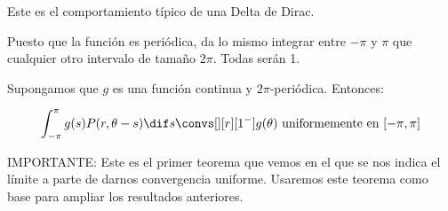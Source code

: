\begin{itemize}
			Este es el comportamiento típico de una Delta de Dirac.

			\begin{center}
			\end{center}

			\noindent Puesto que la función es periódica, da lo mismo integrar entre $-\pi$ y $\pi$ que cualquier otro intervalo de tamaño $2\pi$. Todas serán 1.

		\end{itemize}

		\begin{theorem} \label{thm:ConvUniformePoisson}
			Supongamos que $g$ es una función continua y $2\pi$-periódica. Entonces:

			\[ \int^\pi_{-\pi} g(s)P(r, \theta-s) \dif s \convs[][r][1^-] g(\theta) \text{ uniformemente en } [-\pi,\pi] \]

			IMPORTANTE: Este es el primer teorema que vemos en el que se nos indica el límite a parte de darnos convergencia uniforme. Usaremos este teorema como base para ampliar los resultados anteriores.
		\end{theorem}

